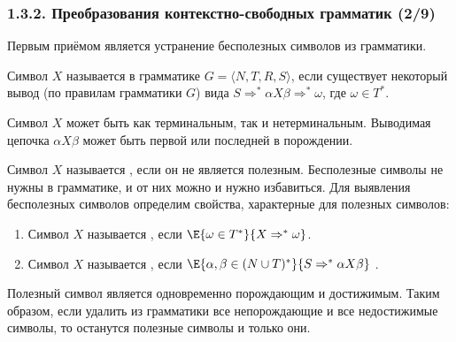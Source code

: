 \begin{frame}
\frametitle{1.3.2. Преобразования контекстно-свободных грамматик (2/9)}

Первым приёмом является устранение бесполезных символов из грамматики.

\smallskip
Символ $X$ называется 
 в грамматике 
$G=\langle{N,T,R,S}\rangle$, если существует некоторый 
вывод (по правилам грамматики $G$) вида $S \Rightarrow^* \alpha X \beta \Rightarrow^* \omega$, 
где $\omega \in T^*$.

\begin{remark}
Символ $X$ может быть как терминальным,
так и нетерминальным.
Выводимая цепочка $ \alpha X \beta$ может быть первой или последней в порождении.
\end{remark}    

\smallskip
Символ $X$ называется , если он не является полезным.
Бесполезные символы не нужны в грамматике, 
и от них можно и нужно избавиться.
Для выявления бесполезных символов определим свойства, характерные для полезных символов:

\begin{enumerate}
\item Символ $X$ называется  , если $\E{\omega \in T^*}{X \Rightarrow^*\omega}$. 
\item Символ $X$ называется  , если 
$\E{\alpha, \beta\in (N\cup T)^*}{S \Rightarrow^* \alpha X \beta}$ .
\end{enumerate}

Полезный символ является одновременно порождающим и достижимым. Таким образом, если удалить из грамматики все непорождающие и все недостижимые символы, то останутся  полезные символы и только они.


\end{frame}


